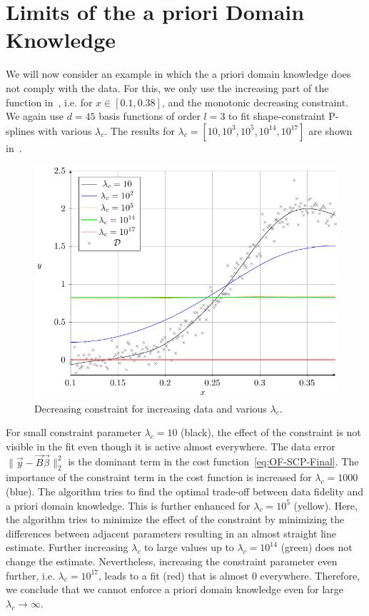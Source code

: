 
\section{Limits of the a priori Domain Knowledge} \label{sec:limits-of-lambda_c}

We will now consider an example in which the a priori domain knowledge does not comply with the data. For this, we only use the increasing part of the function in~, i.e. for $x \in [0.1, 0.38]$, and the monotonic decreasing constraint. We again use $d=45$ basis functions of order $l=3$ to fit shape-constraint P-splines with various $\lambda_c$. The results for $\lambda_c = [10, 10^3, 10^5, 10^{14}, 10^{17}]$ are shown in~.


\begin{figure}[H]
	\centering
	\includegraphics{graphics/pgfplots/cha4/exp-wrongBehav.pdf}
	\caption{Decreasing constraint for increasing data and various $\lambda_c$.}
	\label{fig:example-wrongBehav}
\end{figure}
%
For small constraint parameter $\lambda_c = 10$ (black), the effect of the constraint is not visible in the fit even though it is active almost everywhere. The data error $\lVert \vec{y} - \vec{B} \vec{\beta} \rVert^2_2$ is the dominant term in the cost function~\ref{eq:OF-SCP-Final}. The importance of the constraint term in the cost function is increased for $\lambda_c = 1000$ (blue). The algorithm tries to find the optimal trade-off between data fidelity and a priori domain knowledge. This is further enhanced for $\lambda_c = 10^5$ (yellow). Here, the algorithm tries to minimize the effect of the constraint by minimizing the differences between adjacent parameters resulting in an almost straight line estimate. Further increasing $\lambda_c$ to large values up to $\lambda_c = 10^{14}$ (green) does not change the estimate. Nevertheless, increasing the constraint parameter even further, i.e. $\lambda_c = 10^{17}$, leads to a fit (red) that is almost 0 everywhere. Therefore, we conclude that we cannot enforce a priori domain knowledge even for large $\lambda_c \rightarrow \infty$. 

